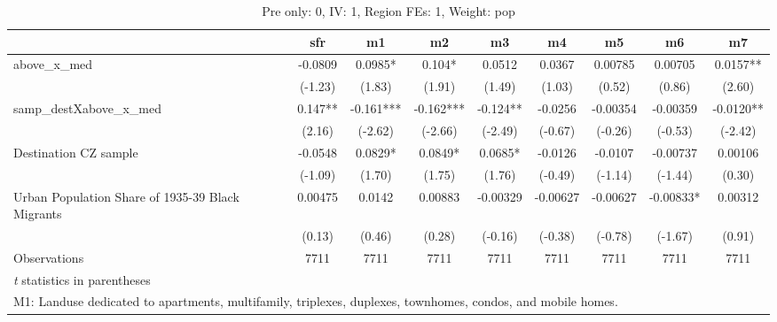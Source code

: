 \begin{table}[htbp]\centering
\def\sym#1{\ifmmode^{#1}\else\(^{#1}\)\fi}
\caption{Pre only: 0, IV: 1, Region FEs: 1, Weight: pop}
\begin{tabular}{l*{8}{c}}
\toprule
                    &\multicolumn{1}{c}{sfr}&\multicolumn{1}{c}{m1}&\multicolumn{1}{c}{m2}&\multicolumn{1}{c}{m3}&\multicolumn{1}{c}{m4}&\multicolumn{1}{c}{m5}&\multicolumn{1}{c}{m6}&\multicolumn{1}{c}{m7}\\
\midrule
above\_x\_med         &     -0.0809   &      0.0985*  &       0.104*  &      0.0512   &      0.0367   &     0.00785   &     0.00705   &      0.0157** \\
                    &     (-1.23)   &      (1.83)   &      (1.91)   &      (1.49)   &      (1.03)   &      (0.52)   &      (0.86)   &      (2.60)   \\
\addlinespace
samp\_destXabove\_x\_med&       0.147** &      -0.161***&      -0.162***&      -0.124** &     -0.0256   &    -0.00354   &    -0.00359   &     -0.0120** \\
                    &      (2.16)   &     (-2.62)   &     (-2.66)   &     (-2.49)   &     (-0.67)   &     (-0.26)   &     (-0.53)   &     (-2.42)   \\
\addlinespace
Destination CZ sample&     -0.0548   &      0.0829*  &      0.0849*  &      0.0685*  &     -0.0126   &     -0.0107   &    -0.00737   &     0.00106   \\
                    &     (-1.09)   &      (1.70)   &      (1.75)   &      (1.76)   &     (-0.49)   &     (-1.14)   &     (-1.44)   &      (0.30)   \\
\addlinespace
Urban Population Share of 1935-39 Black Migrants&     0.00475   &      0.0142   &     0.00883   &    -0.00329   &    -0.00627   &    -0.00627   &    -0.00833*  &     0.00312   \\
                    &      (0.13)   &      (0.46)   &      (0.28)   &     (-0.16)   &     (-0.38)   &     (-0.78)   &     (-1.67)   &      (0.91)   \\
\midrule
Observations        &        7711   &        7711   &        7711   &        7711   &        7711   &        7711   &        7711   &        7711   \\
\bottomrule
\multicolumn{9}{l}{\footnotesize \textit{t} statistics in parentheses}\\
\multicolumn{9}{l}{\footnotesize M1: Landuse dedicated to apartments, multifamily, triplexes, duplexes, townhomes, condos, and mobile homes.}\\

\end{tabular}
\end{table}
